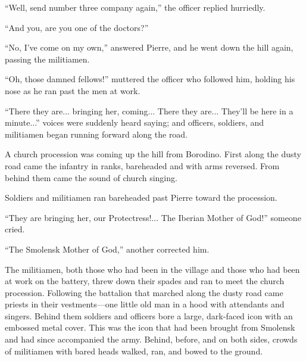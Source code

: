 ``Well, send number three company again,'' the officer replied
hurriedly.

``And you, are you one of the doctors?''

``No, I've come on my own,'' answered Pierre, and he went down
the hill again, passing the militiamen.

``Oh, those damned fellows!'' muttered the officer who followed
him, holding his nose as he ran past the men at work.

``There they are... bringing her, coming... There they
are... They'll be here in a minute...'' voices were suddenly
heard saying; and officers, soldiers, and militiamen began
running forward along the road.

A church procession was coming up the hill from Borodino. First
along the dusty road came the infantry in ranks, bareheaded and
with arms reversed. From behind them came the sound of church
singing.

Soldiers and militiamen ran bareheaded past Pierre toward the
procession.

``They are bringing her, our Protectress!... The Iberian Mother
of God!''  someone cried.

``The Smolensk Mother of God,'' another corrected him.

The militiamen, both those who had been in the village and those
who had been at work on the battery, threw down their spades and
ran to meet the church procession. Following the battalion that
marched along the dusty road came priests in their
vestments---one little old man in a hood with attendants and
singers. Behind them soldiers and officers bore a large,
dark-faced icon with an embossed metal cover. This was the icon
that had been brought from Smolensk and had since accompanied the
army. Behind, before, and on both sides, crowds of militiamen
with bared heads walked, ran, and bowed to the ground.

